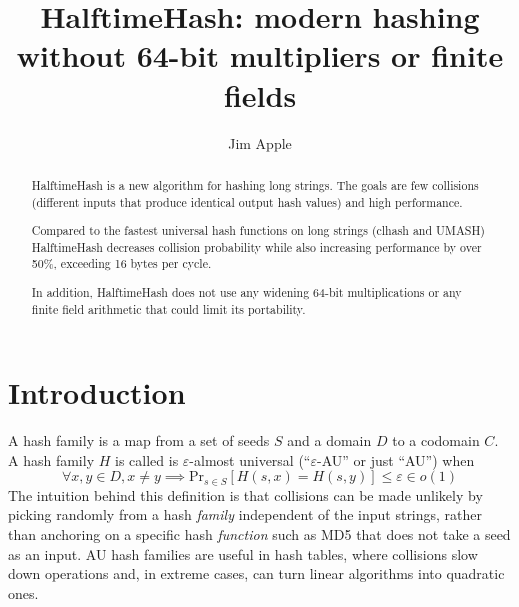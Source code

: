 \documentclass[runningheads]{llncs}
\begin{document}
\title{HalftimeHash: modern hashing without 64-bit multipliers or finite fields}
\author{Jim Apple
}

\maketitle

\begin{abstract}
HalftimeHash is a new algorithm for hashing long strings.
The goals are few collisions (different inputs that produce identical output hash values) and high performance.

Compared to the fastest universal hash functions on long strings (clhash and UMASH) HalftimeHash decreases collision probability while also increasing performance by over 50\%, exceeding 16 bytes per cycle.

In addition, HalftimeHash does not use any widening 64-bit multiplications or any finite field arithmetic that could limit its portability.

\end{abstract}

\section{Introduction}
A hash family is a map from a set of seeds $S$ and a domain $D$ to a codomain $C$.
A hash family $H$ is called is $\varepsilon$-almost universal (``$\varepsilon$-AU'' or just ``AU'') when
\[
\forall x,y \in D, x \neq y \implies \mathrm{Pr}_{s \in S}[H(s, x) = H(s, y)] \leq \varepsilon \in o(1)
\]
The intuition behind this definition is that collisions can be made unlikely by picking randomly from a hash {\em family} independent of the input strings, rather than anchoring on a specific hash {\em function} such as MD5 that does not take a seed as an input. AU hash families are useful in hash tables, where collisions slow down operations and, in extreme cases, can turn linear algorithms into quadratic ones. \cite{tabulation,rust-quadratic,impala-quadratic,algorithm-attack}
\end{document}
